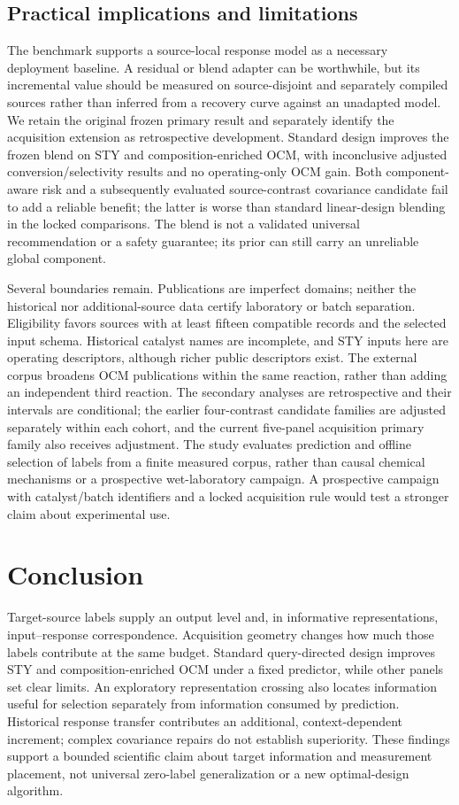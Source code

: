 \documentclass[11pt]{article}
\begin{document}
\subsection{Practical implications and limitations}
The benchmark supports a source-local response model as a necessary deployment baseline. A residual or blend adapter can be worthwhile, but its incremental value should be measured on source-disjoint and separately compiled sources rather than inferred from a recovery curve against an unadapted model. We retain the original frozen primary result and separately identify the acquisition extension as retrospective development. Standard design improves the frozen blend on STY and composition-enriched OCM, with inconclusive adjusted conversion/selectivity results and no operating-only OCM gain. Both component-aware risk and a subsequently evaluated source-contrast covariance candidate fail to add a reliable benefit; the latter is worse than standard linear-design blending in the locked comparisons. The blend is not a validated universal recommendation or a safety guarantee; its prior can still carry an unreliable global component.

Several boundaries remain. Publications are imperfect domains; neither the historical nor additional-source data certify laboratory or batch separation. Eligibility favors sources with at least fifteen compatible records and the selected input schema. Historical catalyst names are incomplete, and STY inputs here are operating descriptors, although richer public descriptors exist. The external corpus broadens OCM publications within the same reaction, rather than adding an independent third reaction. The secondary analyses are retrospective and their intervals are conditional; the earlier four-contrast candidate families are adjusted separately within each cohort, and the current five-panel acquisition primary family also receives adjustment. The study evaluates prediction and offline selection of labels from a finite measured corpus, rather than causal chemical mechanisms or a prospective wet-laboratory campaign. A prospective campaign with catalyst/batch identifiers and a locked acquisition rule would test a stronger claim about experimental use.

\section{Conclusion}
Target-source labels supply an output level and, in informative representations, input--response correspondence. Acquisition geometry changes how much those labels contribute at the same budget. Standard query-directed design improves STY and composition-enriched OCM under a fixed predictor, while other panels set clear limits. An exploratory representation crossing also locates information useful for selection separately from information consumed by prediction. Historical response transfer contributes an additional, context-dependent increment; complex covariance repairs do not establish superiority. These findings support a bounded scientific claim about target information and measurement placement, not universal zero-label generalization or a new optimal-design algorithm.
\end{document}
